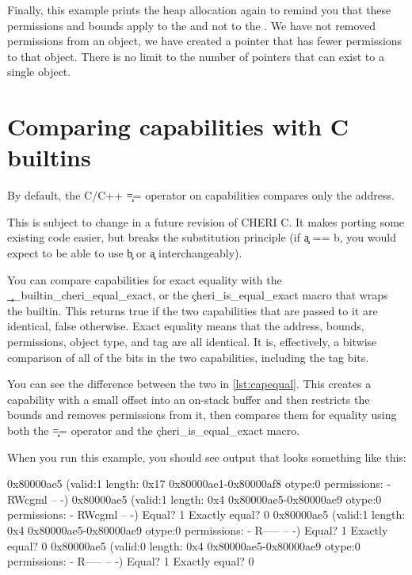 {{{{{{{{Finally, this example prints the heap allocation again to remind you that these permissions and bounds apply to the  and not to the .
We have not removed permissions from an object, we have created a pointer that has fewer permissions to that object.
There is no limit to the number of pointers that can exist to a single object.

\section{Comparing capabilities with C builtins}

By default, the C/C++ \c{==} operator on capabilities compares only the address.

\begin{note}
	This is subject to change in a future revision of CHERI C.
	It makes porting some existing code easier, but breaks the substitution principle (if \c{a == b}, you would expect to be able to use \c{b} or \c{a} interchangeably).
\end{note}

You can compare capabilities for exact equality with the \c{__builtin_cheri_equal_exact}, or the \c{cheri_is_equal_exact} macro that wraps the builtin.
This returns true if the two capabilities that are passed to it are identical, false otherwise.
Exact equality means that the address, bounds, permissions, object type, and tag are all identical.
It is, effectively, a bitwise comparison of all of the bits in the two capabilities, including the tag bits.

You can see the difference between the two in \ref{lst:capequal}.
This creates a capability with a small offset into an on-stack buffer and then restricts the bounds and removes permissions from it, then compares them for equality using both the \c{==} operator and the \c{cheri_is_equal_exact} macro.

\codelisting[filename=examples/compare_capabilities/example.c,marker=capability_equality,label=lst:capequal,caption="Comparing two capabilities for equality."]{}

When you run this example, you should see output that looks something like this:

\begin{console}
0x80000ae5 (valid:1 length: 0x17 0x80000ae1-0x80000af8 otype:0 permissions: - RWcgml -- -)
0x80000ae5 (valid:1 length: 0x4 0x80000ae5-0x80000ae9 otype:0 permissions: - RWcgml -- -)
Equal? 1
Exactly equal? 0
0x80000ae5 (valid:1 length: 0x4 0x80000ae5-0x80000ae9 otype:0 permissions: - R----- -- -)
Equal? 1
Exactly equal? 0
0x80000ae5 (valid:0 length: 0x4 0x80000ae5-0x80000ae9 otype:0 permissions: - R----- -- -)
Equal? 1
Exactly equal? 0
\end{console}

}}}}}}}}
